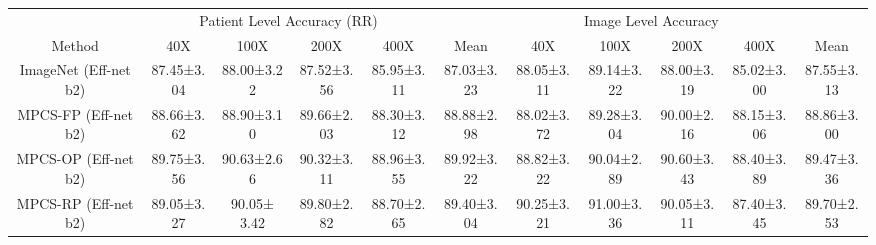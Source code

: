 \documentclass[conference]{IEEEtran}
\begin{document}
\begin{table*}[h!t]
\begin{adjustbox}{max width=\textwidth}
\begin{tabular}{c|cccc|c|cccc|c}
\hline
                         & \multicolumn{4}{c|}{Patient Level Accuracy (RR)}                                                                                                                                       &                        & \multicolumn{4}{c|}{Image Level Accuracy}                                                                        &                        \\ \cline{2-5} \cline{7-10}
\multirow{-2}{*}{Method} & \multicolumn{1}{c|}{40X}        & \multicolumn{1}{c|}{100X}                               & \multicolumn{1}{c|}{200X}                              & 400X                              & \multirow{-2}{*}{Mean} & \multicolumn{1}{c|}{40X}        & \multicolumn{1}{c|}{100X}       & \multicolumn{1}{c|}{200X}       & 400X       & \multirow{-2}{*}{Mean} \\ \hline
ImageNet (Eff-net b2)    & \multicolumn{1}{c|}{87.45±3.04} & \multicolumn{1}{c|}{88.00±3.22}                         & \multicolumn{1}{c|}{87.52±3.56}                        & 85.95±3.11                        & 87.03±3.23             & \multicolumn{1}{c|}{88.05±3.11} & \multicolumn{1}{c|}{89.14±3.22} & \multicolumn{1}{c|}{88.00±3.19} & 85.02±3.00 & 87.55±3.13             \\
MPCS-FP (Eff-net b2)     & \multicolumn{1}{c|}{88.66±3.62} & \multicolumn{1}{c|}{88.90±3.10}                         & \multicolumn{1}{c|}{89.66±2.03}                        & 88.30±3.12                        & 88.88±2.98             & \multicolumn{1}{c|}{88.02±3.72} & \multicolumn{1}{c|}{89.28±3.04} & \multicolumn{1}{c|}{90.00±2.16} & 88.15±3.06 & 88.86±3.00             \\
MPCS-OP (Eff-net b2)     & \multicolumn{1}{c|}{89.75±3.56} & \multicolumn{1}{c|}{90.63±2.66}                         & \multicolumn{1}{c|}{{\color[HTML]{1E1E1E} 90.32±3.11}} & {\color[HTML]{1E1E1E} 88.96±3.55} & 89.92±3.22             & \multicolumn{1}{c|}{88.82±3.22} & \multicolumn{1}{c|}{90.04±2.89} & \multicolumn{1}{c|}{90.60±3.43} & 88.40±3.89 & 89.47±3.36             \\
MPCS-RP (Eff-net b2)     & \multicolumn{1}{c|}{89.05±3.27} & \multicolumn{1}{c|}{{\color[HTML]{1E1E1E} 90.05± 3.42}} & \multicolumn{1}{c|}{{\color[HTML]{1E1E1E} 89.80±2.82}} & {\color[HTML]{1E1E1E} 88.70±2.65} & 89.40±3.04             & \multicolumn{1}{c|}{90.25±3.21} & \multicolumn{1}{c|}{91.00±3.36} & \multicolumn{1}{c|}{90.05±3.11} & 87.40±3.45 & 89.70±2.53             \\

\end{tabular}
\end{adjustbox}
\end{table*}
\end{document}
